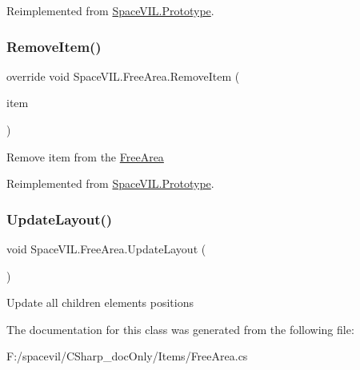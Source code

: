 Reimplemented from \mbox{\hyperlink{class_space_v_i_l_1_1_prototype}{Space\+V\+I\+L.\+Prototype}}.

\mbox{\label{class_space_v_i_l_1_1_free_area_ae9b39df00c0fa786b4072b8e49e3aacc}} 
\subsubsection{\texorpdfstring{Remove\+Item()}{RemoveItem()}}
{\footnotesize\ttfamily override void Space\+V\+I\+L.\+Free\+Area.\+Remove\+Item (\begin{DoxyParamCaption}\item[{\mbox{\hyperlink{interface_space_v_i_l_1_1_core_1_1_i_base_item}{I\+Base\+Item}}}]{item }\end{DoxyParamCaption})\hspace{0.3cm}{\ttfamily [virtual]}}



Remove item from the \mbox{\hyperlink{class_space_v_i_l_1_1_free_area}{Free\+Area}} 



Reimplemented from \mbox{\hyperlink{class_space_v_i_l_1_1_prototype_a7a2aabccfe6389f71d0265fa73f0ae87}{Space\+V\+I\+L.\+Prototype}}.

\mbox{\label{class_space_v_i_l_1_1_free_area_a88f3dc2645275f25f2fae769e7a1423a}} 
\subsubsection{\texorpdfstring{Update\+Layout()}{UpdateLayout()}}
{\footnotesize\ttfamily void Space\+V\+I\+L.\+Free\+Area.\+Update\+Layout (\begin{DoxyParamCaption}{ }\end{DoxyParamCaption})}



Update all children elements positions 



The documentation for this class was generated from the following file\+:\begin{DoxyCompactItemize}
\item 
F\+:/spacevil/\+C\+Sharp\+\_\+doc\+Only/\+Items/Free\+Area.\+cs\end{DoxyCompactItemize}
